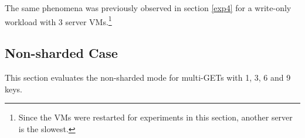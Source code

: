 \documentclass[report.tex]{subfiles}
\begin{document}
The same phenomena was previously observed in section \ref{exp4} for a write-only workload with 3 server VMs.\footnote{Since the VMs were restarted for experiments in this section, another server is the slowest.}


\subsection{Non-sharded Case}

This section evaluates the non-sharded mode for multi-GETs with 1, 3, 6 and 9 keys.

\end{document}
